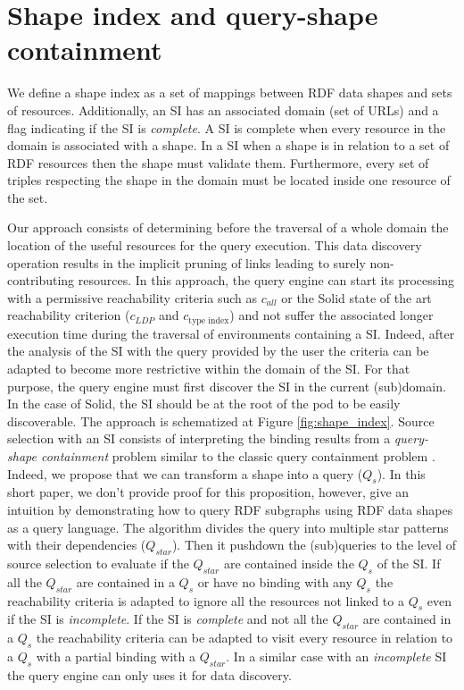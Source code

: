 \section{Shape index and query-shape containment}

We define a shape index as a set of mappings between RDF data shapes and sets of resources.
Additionally, an SI has an associated domain (set of URLs)
and a flag indicating if the SI is \emph{complete}.
A SI is complete when every resource in the domain is associated with a shape.
In a SI when a shape is in relation to a set of RDF resources then the shape must validate them.
Furthermore, every set of triples respecting the shape in the domain must be located inside one resource of the set.

Our approach consists of determining before the traversal of a whole domain the location of the useful resources for the query execution.
This data discovery operation results in the implicit pruning of links leading to surely non-contributing resources.
In this approach, the query engine can start its processing with a permissive reachability criteria
such as $c_{all}$ \cite{Hartig2012} or the Solid state of the art reachability criterion ($c_{LDP}$ and $c_{\text{type index}}$) \cite{Taelman2023}
and not suffer the associated longer execution time during the traversal of environments containing a SI.
Indeed, after the analysis of the SI with the query provided by the user the criteria can be adapted to become more restrictive within the domain of the SI.
For that purpose, the query engine must first discover the SI in the current (sub)domain.
In the case of Solid, the SI should be at the root of the pod to be easily discoverable.
The approach is schematized at Figure \ref{fig:shape_index}.
Source selection with an SI consists of interpreting the binding results from a \emph{query-shape containment} problem similar to the classic query containment problem \cite{afariQCE, Spasi2023}.
Indeed, we propose that we can transform a shape into a query ($Q_{s}$).
In this short paper, we don't provide proof for this proposition, however, 
\citeauthor{Delva2021} give an intuition by demonstrating how to query RDF subgraphs using RDF data shapes as a query language.
The algorithm divides the query into multiple star patterns with their dependencies ($Q_{star}$).
Then it pushdown \cite{Yang2021FlexPushdownDBHP} the (sub)queries to the level of source selection to evaluate if the $Q_{star}$ are contained inside the $Q_s$ of the SI.
If all the $Q_{star}$ are contained in a $Q_{s}$ or have no binding with any $Q_{s}$
the reachability criteria is adapted to ignore all the resources not linked to a $Q_{s}$ even if the SI is \emph{incomplete}.
If the SI is \emph{complete} and not all the $Q_{star}$ are contained in a $Q_{s}$ the reachability criteria can be adapted
to visit every resource in relation to a $Q_{s}$ with a partial binding with a $Q_{star}$.
In a similar case with an \emph{incomplete} SI the query engine can only uses it for data discovery.

